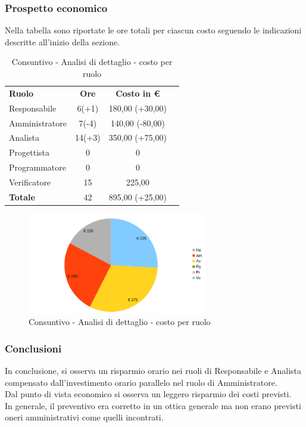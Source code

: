 \newpage
\subsubsection{Prospetto economico}
Nella tabella sono riportate le ore totali per ciascun costo seguendo le indicazioni descritte all'inizio della sezione.

\begin{table} [h!]
	\begin{center}
		\begin{tabular} { m{3 cm} c c c  }
			\rowcolor{lightgray}
			\textbf{Ruolo}  & \textbf{Ore} & \textbf{Costo in \euro} \\
			Responsabile    & 6(+1)      & 180,00 (+30,00) \\
			Amministratore  & 7(-4)      & 140,00 (-80,00)  \\
			Analista        & 14(+3)     & 350,00 (+75,00) \\
			Progettista     & 0          & 0 \\
			Programmatore   & 0          & 0  \\
			Verificatore    & 15         & 225,00  \\
			\textbf{Totale} & 42         & 895,00 (+25,00) \\
			
		\end{tabular}
		\caption{Consuntivo - Analisi di dettaglio - costo per ruolo}
	\end{center}
\end{table}
	\begin{figure} [h!]
	\centering
	\includegraphics[width=0.7\textwidth]{res/img/grafici/consuntivo-torta-analisi di dettaglio.png}
	\caption{Consuntivo - Analisi di dettaglio - costo per ruolo} 
\end{figure}

\subsubsection{Conclusioni }
In conclusione, si osserva un risparmio orario nei ruoli di Responsabile e Analista compensato dall'investimento orario parallelo nel ruolo di Amministratore.\\
Dal punto di vista economico si osserva un leggero risparmio dei costi previsti. \\
In generale, il preventivo era corretto in un ottica generale ma non erano previsti oneri amministrativi come quelli incontrati.


